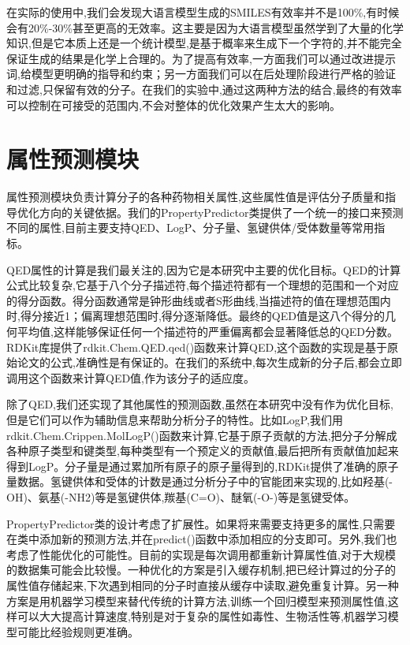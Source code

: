 在实际的使用中,我们会发现大语言模型生成的SMILES有效率并不是100\%,有时候会有20\%-30\%甚至更高的无效率。这主要是因为大语言模型虽然学到了大量的化学知识,但是它本质上还是一个统计模型,是基于概率来生成下一个字符的,并不能完全保证生成的结果是化学上合理的。为了提高有效率,一方面我们可以通过改进提示词,给模型更明确的指导和约束；另一方面我们可以在后处理阶段进行严格的验证和过滤,只保留有效的分子。在我们的实验中,通过这两种方法的结合,最终的有效率可以控制在可接受的范围内,不会对整体的优化效果产生太大的影响。

\section{属性预测模块}

属性预测模块负责计算分子的各种药物相关属性,这些属性值是评估分子质量和指导优化方向的关键依据。我们的PropertyPredictor类提供了一个统一的接口来预测不同的属性,目前主要支持QED、LogP、分子量、氢键供体/受体数量等常用指标。

QED属性的计算是我们最关注的,因为它是本研究中主要的优化目标。QED的计算公式比较复杂,它基于八个分子描述符,每个描述符都有一个理想的范围和一个对应的得分函数。得分函数通常是钟形曲线或者S形曲线,当描述符的值在理想范围内时,得分接近1；偏离理想范围时,得分逐渐降低。最终的QED值是这八个得分的几何平均值,这样能够保证任何一个描述符的严重偏离都会显著降低总的QED分数。RDKit库提供了rdkit.Chem.QED.qed()函数来计算QED,这个函数的实现是基于原始论文的公式,准确性是有保证的。在我们的系统中,每次生成新的分子后,都会立即调用这个函数来计算QED值,作为该分子的适应度。

除了QED,我们还实现了其他属性的预测函数,虽然在本研究中没有作为优化目标,但是它们可以作为辅助信息来帮助分析分子的特性。比如LogP,我们用\linebreak[0] rdkit.Chem.Crippen.\linebreak[0] MolLogP()函数来计算,它基于原子贡献的方法,把分子分解成各种原子类型和键类型,每种类型有一个预定义的贡献值,最后把所有贡献值加起来得到LogP。分子量是通过累加所有原子的原子量得到的,RDKit提供了准确的原子量数据。氢键供体和受体的计数是通过分析分子中的官能团来实现的,比如羟基(-OH)、氨基(-NH2)等是氢键供体,羰基(C=O)、醚氧(-O-)等是氢键受体。

PropertyPredictor类的设计考虑了扩展性。如果将来需要支持更多的属性,只需要在类中添加新的预测方法,并在predict()函数中添加相应的分支即可。另外,我们也考虑了性能优化的可能性。目前的实现是每次调用都重新计算属性值,对于大规模的数据集可能会比较慢。一种优化的方案是引入缓存机制,把已经计算过的分子的属性值存储起来,下次遇到相同的分子时直接从缓存中读取,避免重复计算。另一种方案是用机器学习模型来替代传统的计算方法,训练一个回归模型来预测属性值,这样可以大大提高计算速度,特别是对于复杂的属性如毒性、生物活性等,机器学习模型可能比经验规则更准确。

